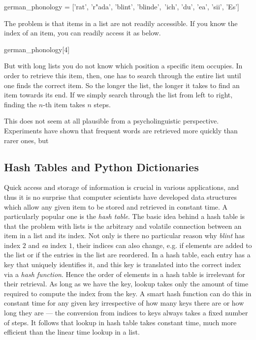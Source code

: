 \begin{pythoncode}
    german_phonology = ['rat', 'r"ada', 'blint', 'blinde',\
                        'ich', 'du', 'ea', 'sii', 'Es']
\end{pythoncode}
%
The problem is that items in a list are not readily accessible.
If you know the index of an item, you can readily access it as below.

\begin{pythoncode}
    german_phonology[4]
\end{pythoncode}
%
But with long lists you do not know which position a specific item occupies.
In order to retrieve this item, then, one has to search through the entire list until one finds the correct item.
So the longer the list, the longer it takes to find an item towards its end.
If we simply search through the list from left to right, finding the $n$-th item takes $n$ steps.


This does not seem at all plausible from a psycholinguistic perspective.
Experiments have shown that frequent words are retrieved more quickly than rarer ones, but %

\subsection{Hash Tables and Python Dictionaries}

Quick access and storage of information is crucial in various applications, and thus it is no surprise that computer scientists have developed data structures which allow any given item to be stored and retrieved in constant time.
A particularly popular one is the \emph{hash table}.
The basic idea behind a hash table is that the problem with lists is the arbitrary and volatile connection between an item in a list and its index.
Not only is there no particular reason why \emph{blint} has index $2$ and \emph{ea} index $1$, their indices can also change, e.g. if elements are added to the list or if the entries in the list are reordered.
In a hash table, each entry has a key that uniquely identifies it, and this key is translated into the correct index via a \emph{hash function}.
Hence the order of elements in a hash table is irrelevant for their retrieval.
As long as we have the key, lookup takes only the amount of time required to compute the index from the key.
A smart hash function can do this in constant time for any given key irrespective of how many keys there are or how long they are --- the conversion from indices to keys always takes a fixed number of steps.
It follows that lookup in hash table takes constant time, much more efficient than the linear time lookup in a list.

